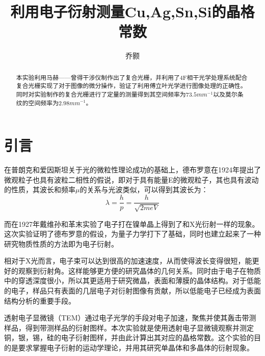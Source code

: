 \documentclass[aps,pre,12pt,preprint,onecolumn,showpacs,showkeys,UTF8]{revtex4-1}
\begin{document}
\title{\bf\heiti{}利用电子衍射测量Cu,Ag,Sn,Si的晶格常数\vspace{15mm}}
\author{\fangsong 乔颢\vspace{2mm}}
\begin{abstract}
	\vspace{10mm}
	\begin{spacing}{1.5}
		\songti{}
		本实验利用马赫——曾得干涉仪制作出了复合光栅，并利用了4F相干光学处理系统配合复合光栅实现了对于图像的微分操作，验证了利用傅立叶光学进行图像处理的正确性。同时对实验制作的复合光栅进行了定量的测量得到其空间频率为$73.5mm^{-1}$以及莫尔条纹的空间频率为$2.98mm^{-1}$。
	\end{spacing}
\end{abstract}

\maketitle

\section{引言}
在普朗克和爱因斯坦关于光的微粒性理论成功的基础上，德布罗意在1924年提出了微观粒子也具有波粒二相性的假说，即对于具有能量E的微观粒子，其也具有波动的性质，其波长和频率$\mu$的关系与光波类似，可以得到其波长为：
\begin{equation}
	\lambda=\frac{h}{p}=\frac{h}{\sqrt{2meV}}
\end{equation}

而在1927年戴维孙和革末实验了电子打在镍单晶上得到了和X光衍射一样的现象。这次实验证明了德布罗意的假设，为量子力学打下了基础，同时也建立起来了一种研究物质性质的方法即为电子衍射。

相对于X光而言，电子束可以达到很高的加速速度，从而使得波长变得很短，能更好的观察到衍射角。这样能够更方便的研究晶体的几何关系。同时由于电子在物质中的穿透深度很小，所以其更适用于研究微晶，表面和薄膜的晶体结构。对于低能的电子，样品只有表面的几层电子对衍射图像有贡献，所以低能电子已经成为表面结构分析的重要手段。

透射电子显微镜（TEM）通过电子光学的手段对电子加速，聚焦并使其轰击带测样品，得到带测样品的衍射图样。本次实验就是使用透射电子显微镜观察并测定铜，银，锡，硅的电子衍射图样，并由此计算出其对应的晶格常数。这个实验的目的是要求掌握电子衍射的运动学理论，并用其研究单晶体和多晶体的衍射现象。
\end{document}
